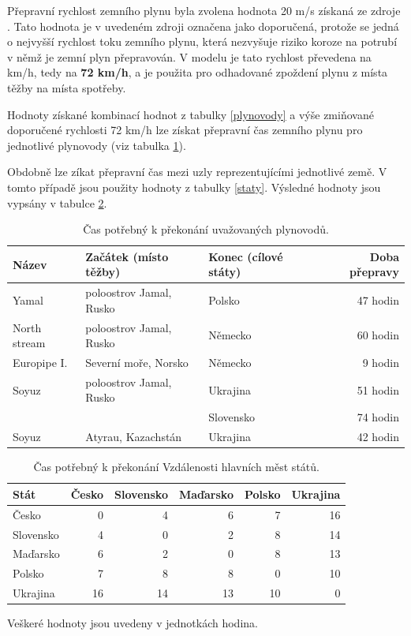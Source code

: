 \documentclass[a4paper,11pt]{article}
\begin{document}

Přepravní rychlost zemního plynu byla zvolena hodnota 20 m/s získaná ze zdroje
\cite{engineering}.
Tato hodnota je v uvedeném zdroji označena jako doporučená,
protože se jedná o nejvyšší rychlost toku zemního plynu,
která nezvyšuje riziko koroze na  potrubí v němž je zemní plyn přepravován.
V modelu je tato rychlost převedena na km/h, tedy na \textbf{72 km/h}, a je použita pro
odhadované zpoždení plynu z místa těžby na místa spotřeby.

Hodnoty získané kombinací hodnot z tabulky \ref{plynovody} a výše zmiňované
doporučené rychlosti 72 km/h lze získat přepravní čas zemního plynu pro jednotlivé
plynovody (viz tabulka \ref{plynovodyprevod}).

Obdobně lze zíkat přepravní čas mezi uzly reprezentujícími jednotlivé země.
V tomto případě jsou použity hodnoty z tabulky \ref{staty}. 
Výsledné hodnoty jsou vypsány v tabulce  \ref{statyprevod}.

\begin{table}[h!]
\begin{center}
\begin{tabular}{|l|l|l|r|}
    \hline
    Název 			& Začátek (místo těžby)		& Konec (cílové státy) 		& Doba přepravy \\
    \hline 
    Yamal			& poloostrov Jamal, Rusko 	& Polsko				& 47 hodin\\ 
    North stream 	& poloostrov Jamal, Rusko 	& Německo			& 60 hodin\\
    Europipe I. 		& Severní moře, Norsko 		& Německo  			& 9 hodin\\
    Soyuz 			& poloostrov Jamal, Rusko 	& Ukrajina 			& 51 hodin\\
					&							& Slovensko			& 74 hodin\\ 
	Soyuz 			& Atyrau, Kazachstán	 		& Ukrajina			& 42 hodin\\	
    \hline
\end{tabular}
\caption{Čas potřebný k překonání uvažovaných plynovodů.} 
\label{plynovodyprevod}
\end{center}
\end{table}


\begin{table}[h!]
\begin{center}
\begin{tabular}{|l|r|r|r|r|r|}
    \hline
    Stát 			& Česko		& Slovensko 		& Maďarsko	& Polsko & Ukrajina\\
    \hline 
    Česko			& 0 			& 4 				& 6			& 7		 & 16\\ 
    Slovensko 		& 4			& 0				& 2			& 8		 & 14\\
    Maďarsko 		& 6			& 2				& 0			& 8		 & 13\\
    Polsko 			& 7			& 8				& 8		 	& 0		 & 10\\
	Ukrajina			& 16			& 14				& 13			& 10		 & 0\\
    \hline
\end{tabular}
\caption{Čas potřebný k překonání Vzdálenosti hlavních měst států.}
Veškeré hodnoty jsou uvedeny v jednotkách hodina.
\label{statyprevod}
\end{center}
\end{table}
\end{document}
